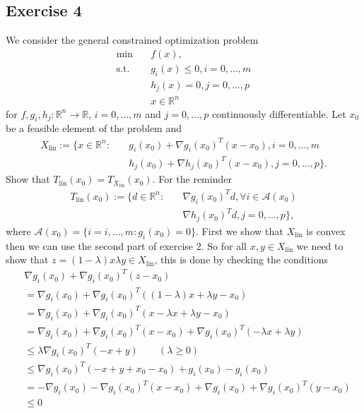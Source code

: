 \subsection{Exercise 4}
We consider the general constrained optimization problem
\begin{align}
    \text{min}\quad & f(x),\\
    \text{s.t.}\quad & g_i(x) \le 0, i=0,\ldots,m\nonumber\\
    &h_j(x) = 0, j=0,\ldots,p\nonumber\\
    & x \in \mathbb{R}^{n}\nonumber
\end{align}
for $f, g_i, h_j: \mathbb{R}^{n}\to \mathbb{R}$, $i=0,\ldots,m$ and
$j=0,\ldots,p$ continuously differentiable. Let $x_0$ be a feasible element
of the problem and
\begin{align}
    X_{\text{lin}} := \{ x \in \mathbb{R}^{n}:\quad
    &g_i(x_0) + \nabla g_i(x_0)^{T}(x-x_0), i=0,\ldots,m\\
    &h_j(x_0) + \nabla h_j(x_0)^{T}(x-x_0), j=0,\ldots,p\}.
\end{align}
Show that $T_\text{lin}(x_0) = T_{X_\text{lin}}(x_0)$.
\newline
For the reminder
\begin{align}
    T_{\text{lin}}(x_0) := \{ d \in \mathbb{R}^{n}:\quad
    &\nabla g_i(x_0)^{T}d, \forall i \in \mathcal{A}(x_0)\\
    &\nabla h_j(x_0)^{T}d, j=0,\ldots,p\},
\end{align}
where $\mathcal{A}(x_0) = \{i=i,\ldots,m:g_i(x_0) = 0\}$. First we show that
$X_\text{lin}$ is convex then we can use the second part of exercise 2. So
for all $x, y \in X_{\text{lin}}$ we need to show that $z=(1-\lambda)x
\lambda y \in X_{\text{lin}}$, this is done by checking the conditions
\begin{align}
    &\nabla g_i(x_0) + \nabla g_i(x_0)^{T} (z-x_0)\\
    &=\nabla g_i(x_0) + \nabla g_i(x_0)^{T} ((1-\lambda)x + \lambda y-x_0)\\
    &=\nabla g_i(x_0) + \nabla g_i(x_0)^{T} (x-\lambda x + \lambda y-x_0)\\
    &=\nabla g_i(x_0) + \nabla g_i(x_0)^{T} (x-x_0)
    + \nabla g_i(x_0)^{T}(-\lambda x + \lambda y)\\
    &\le \lambda \nabla g_i(x_0)^{T}(-x + y) \qquad (\lambda \ge 0 )\\
    &\le \nabla g_i(x_0)^{T}(- x + y + x_0 - x_0) + g_i(x_0)
    -g_i(x_0)\\
    &=-\nabla g_i(x_0) - \nabla g_i(x_0)^{T} (x-x_0)
    + \nabla g_i(x_0) + \nabla g_i(x_0)^{T} (y-x_0)\\
    &\le 0
\end{align}
